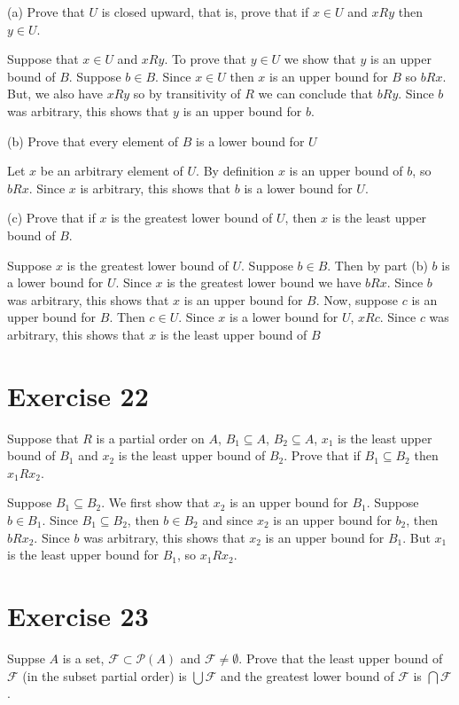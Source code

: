 \documentclass[11pt]{article}
\newcommand{\powerset}[1]{\mathscr{P}(#1)}
\newcommand{\family}[1]{\mathcal{#1}}
\begin{document}
\noindent (a) Prove that $U$ is closed upward, that is, prove that if $x \in U$
and $xRy$ then $y \in U$.

Suppose that $x \in U$ and $xRy$. To prove that $y \in U$ we show that $y$ is 
an upper bound of $B$. Suppose $b \in B$. Since $x \in U$ then $x$ is an upper
bound for $B$ so $bRx$. But, we also have $xRy$ so by transitivity of $R$ we can 
conclude that $bRy$. Since $b$ was arbitrary, this shows that $y$ is an upper 
bound for $b$.

\noindent (b) Prove that every element of $B$ is a lower bound for $U$

Let $x$ be an arbitrary element of $U$. By definition $x$ is an upper bound of $b$,
so $bRx$. Since $x$ is arbitrary, this shows that $b$ is a lower bound for $U$.

\noindent (c) Prove that if $x$ is the greatest lower bound of $U$, then $x$ is 
the least upper bound of $B$.

Suppose $x$ is the greatest lower bound of $U$. Suppose $b \in B$. Then by part 
(b) $b$ is a lower bound for $U$. Since $x$ is the greatest lower bound we have 
$bRx$. Since $b$ was arbitrary, this shows that $x$ is an upper bound for $B$.
Now, suppose $c$ is an upper bound for $B$. Then $c \in U$. Since $x$ is a lower 
bound for $U$, $xRc$. Since $c$ was arbitrary, this shows that $x$ is the least 
upper bound of $B$

\section*{Exercise 22} 

Suppose that $R$ is a partial order on $A$, $B_1 \subseteq A$, $B_2 \subseteq A$,
$x_1$ is the least upper bound of $B_1$ and $x_2$ is the least upper bound of 
$B_2$. Prove that if $B_1 \subseteq B_2$ then $x_1 R x_2$.

Suppose $B_1 \subseteq B_2$. We first show that $x_2$ is an upper bound for $B_1$.
Suppose $b \in B_1$. Since $B_1 \subseteq B_2$, then $b \in B_2$ and since $x_2$
is an upper bound for $b_2$, then $bRx_2$. Since $b$ was arbitrary, this shows that 
$x_2$ is an upper bound for $B_1$. But $x_1$ is the least upper bound for $B_1$, so 
$x_1 R x_2$.

\section*{Exercise 23}

Suppse $A$ is a set, $\family{F} \subset \powerset{A}$ and $\family{F} \neq 
\emptyset$. Prove that the least upper bound of $\family{F}$ (in the subset partial order)
is $\bigcup \family{F}$ and the greatest lower bound of $\family{F}$ is 
$\bigcap \family{F}$.
\end{document}
